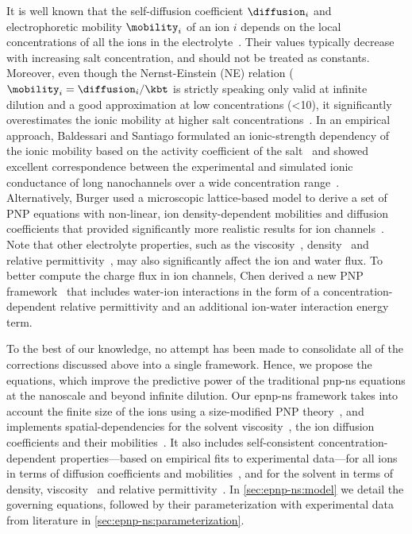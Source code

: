 It is well known that the self-diffusion coefficient $\diffusion_{i}$ and electrophoretic mobility
$\mobility_{i}$ of an ion $i$ depends on the local concentrations of all the ions in the
electrolyte~\cite{ContrerasAburto-2013-1}. Their values typically decrease with increasing salt concentration,
and should not be treated as constants. Moreover, even though the Nernst-Einstein (NE) relation
($\mobility_{i}=\diffusion_{i}/\kbt$ is strictly speaking only valid at infinite dilution and a good
approximation at low concentrations (\SI{<10}{\mM}), it significantly overestimates the ionic mobility at
higher salt concentrations~\cite{Mills-1989,Panopoulos-1986,ContrerasAburto-2013-1,ContrerasAburto-2013-2}. In
an empirical approach, Baldessari and Santiago formulated an ionic-strength dependency of the ionic mobility
based on the activity coefficient of the salt~\cite{Baldessari-2008-1} and showed excellent correspondence
between the experimental and simulated ionic conductance of long nanochannels over a wide concentration
range~\cite{Baldessari-2008-2}. Alternatively, Burger \etal{} used a microscopic lattice-based model to derive
a set of PNP equations with non-linear, ion density-dependent mobilities and diffusion coefficients that
provided significantly more realistic results for ion channels~\cite{Burger-2012}. Note that other electrolyte
properties, such as the viscosity~\cite{Hai-Lang-1996}, density~\cite{Hai-Lang-1996} and relative
permittivity~\cite{Gavish-2016}, may also significantly affect the ion and water flux. To better compute the
charge flux in ion channels, Chen derived a new PNP framework~\cite{Chen-2016} that includes water-ion
interactions in the form of a concentration-dependent relative permittivity and an additional ion-water
interaction energy term.

To the best of our knowledge, no attempt has been made to consolidate all of the corrections discussed above
into a single framework. Hence, we propose the  equations, which improve the predictive
power of the traditional \gls{pnp-ns} equations at the nanoscale and beyond infinite dilution. Our
\gls{epnp-ns} framework takes into account the finite size of the ions using a size-modified PNP
theory~\cite{Borukhov-1997,Lu-2011}, and implements spatial-dependencies for the solvent
viscosity~\cite{Pronk-2014,Vo-2016,Hsu-2017}, the ion diffusion coefficients and their
mobilities~\cite{Makarov-1998,Noskov-2004,Pederson-2015}. It also includes self-consistent
concentration-dependent properties---based on empirical fits to experimental data---for all ions in terms of
diffusion coefficients and mobilities~\cite{Baldessari-2008-1,Mills-1989}, and for the solvent in terms of
density, viscosity~\cite{Hai-Lang-1996} and relative permittivity~\cite{Gavish-2016}. In
\cref{sec:epnp-ns:model} we detail the governing equations, followed by their parameterization with
experimental data from literature in \cref{sec:epnp-ns:parameterization}.


